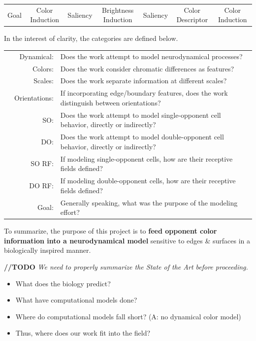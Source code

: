 \documentclass[journal,onecolumn]{IEEEtran}
\begin{document}
\begin{table}
\begin{threeparttable}
\begin{tabular}{rcccccc}
        \multicolumn{1}{r|}{Goal}             & Color Induction        & Saliency             & Brightness Induction           & Saliency              & Color Descriptor        & Color Induction
    \end{tabular}
    \begin{tablenotes}
        \item In the interest of clarity, the categories are defined below.
        \begin{tabular}{p{1.5cm} r l}
            & Dynamical:    & Does the work attempt to model neurodynamical processes? \\
            & Colors:       & Does the work consider chromatic differences as features? \\
            & Scales:       & Does the work separate information at different scales? \\
            & Orientations: & If incorporating edge/boundary features, does the work distinguish between orientations? \\
            & SO:           & Does the work attempt to model single-opponent cell behavior, directly or indirectly? \\
            & DO:           & Does the work attempt to model double-opponent cell behavior, directly or indirectly? \\
            & SO RF:        & If modeling single-opponent cells, how are their receptive fields defined? \\
            & DO RF:        & If modeling double-opponent cells, how are their receptive fields defined? \\
            & Goal:         & Generally speaking, what was the purpose of the modeling effort?
        \end{tabular}
    \end{tablenotes}
    \end{threeparttable}
\end{table}

To summarize, the purpose of this project is to \textbf{feed opponent color information into a neurodynamical model} sensitive to edges \& surfaces in a biologically inspired manner.

\textbf{//TODO} \textit{We need to properly summarize the State of the Art before proceeding.}
\begin{itemize}
    \item What does the biology predict?
    \item What have computational models done?
    \item Where do computational models fall short? (A: no dynamical color model)
    \item Thus, where does our work fit into the field?
\end{itemize}
\end{document}
